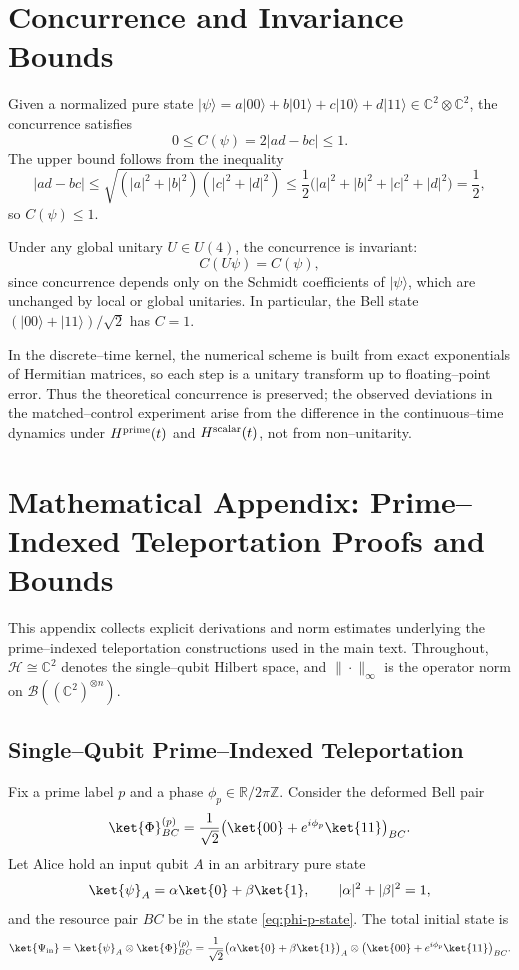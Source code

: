 \documentclass[11pt]{article}
\begin{document}
\section{Concurrence and Invariance Bounds}

Given a normalized pure state \(|\psi\rangle = a|00\rangle + b|01\rangle + c|10\rangle + d|11\rangle \in \mathbb{C}^2\otimes\mathbb{C}^2\), the concurrence satisfies
\[
  0 \le C(\psi) = 2|ad - bc| \le 1.
\]
The upper bound follows from the inequality
\[
  |ad - bc|
  \le \sqrt{(|a|^2 + |b|^2)(|c|^2 + |d|^2)}
  \le \frac12\bigl(|a|^2+|b|^2+|c|^2+|d|^2\bigr)
  = \frac12,
\]
so \(C(\psi) \le 1\).

Under any global unitary \(U\in U(4)\), the concurrence is invariant:
\[
  C(U\psi) = C(\psi),
\]
since concurrence depends only on the Schmidt coefficients of \(|\psi\rangle\), which are unchanged by local or global unitaries. In particular, the Bell state \((|00\rangle+|11\rangle)/\sqrt{2}\) has \(C=1\).

In the discrete–time kernel, the numerical scheme is built from exact exponentials of Hermitian matrices, so each step is a unitary transform up to floating–point error. Thus the theoretical concurrence is preserved; the observed deviations in the matched–control experiment arise from the difference in the continuous–time dynamics under \(H^{\rm prime}(t)\) and \(H^{\rm scalar}(t)\), not from non–unitarity.

\appendix
\section{Mathematical Appendix: Prime–Indexed Teleportation Proofs and Bounds}

This appendix collects explicit derivations and norm estimates underlying the prime–indexed teleportation constructions used in the main text. Throughout, $\mathcal{H}\cong\mathbb{C}^2$ denotes the single–qubit Hilbert space, and $\|\cdot\|_\infty$ is the operator norm on $\mathcal{B}((\mathbb{C}^2)^{\otimes n})$.

\subsection{Single–Qubit Prime–Indexed Teleportation}

Fix a prime label $p$ and a phase $\phi_p\in\mathbb{R}/2\pi\mathbb{Z}$. Consider the deformed Bell pair
\begin{equation}
  \label{eq:phi-p-state}
  \ket{\Phi}^{(p)}_{BC}
  = \frac{1}{\sqrt{2}}\bigl(\ket{00} + e^{i\phi_p}\ket{11}\bigr)_{BC}.
\end{equation}
Let Alice hold an input qubit $A$ in an arbitrary pure state
\[
  \ket{\psi}_{A} = \alpha\ket{0} + \beta\ket{1}, \qquad |\alpha|^2+|\beta|^2=1,
\]
and the resource pair $BC$ be in the state \eqref{eq:phi-p-state}. The total initial state is
\[
  \ket{\Psi_{\text{in}}}
  = \ket{\psi}_A \otimes \ket{\Phi}^{(p)}_{BC}
  = \frac{1}{\sqrt{2}}
    \bigl(\alpha\ket{0} + \beta\ket{1}\bigr)_A
    \otimes
    \bigl(\ket{00} + e^{i\phi_p}\ket{11}\bigr)_{BC}.
\]
\end{document}
